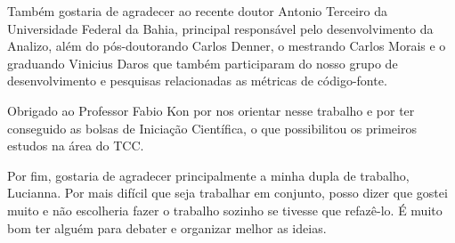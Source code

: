 \documentclass[a4paper, 11pt]{article}
\begin{document}
Também gostaria de agradecer ao recente doutor Antonio Terceiro da Universidade Federal da Bahia, principal responsável
pelo desenvolvimento da Analizo, além do pós-doutorando Carlos Denner, o mestrando Carlos Morais e o graduando Vinicius Daros
que também participaram do nosso grupo de desenvolvimento e pesquisas relacionadas as métricas de código-fonte.

Obrigado ao Professor Fabio Kon por nos orientar nesse trabalho e por ter conseguido as bolsas de Iniciação Científica,
o que possibilitou os primeiros estudos na área do TCC.

Por fim, gostaria de agradecer principalmente a minha dupla de trabalho, Lucianna. Por mais difícil que seja
trabalhar em conjunto, posso dizer que gostei muito e não escolheria fazer o trabalho sozinho se tivesse que refazê-lo.
É muito bom ter alguém para debater e organizar melhor as ideias.
\end{document}
